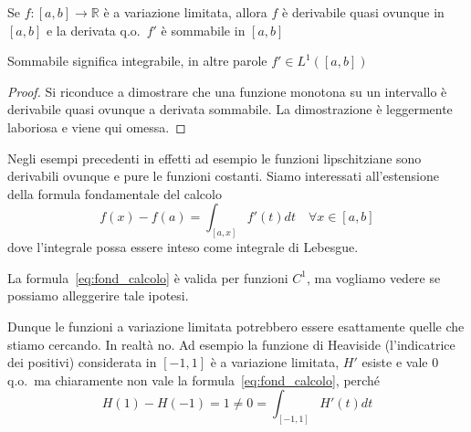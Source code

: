 \begin{theorem}\label{thm:lebesgue_derivata}
    Se \(f: [a,b] \to \mathbb{R}\) è a variazione limitata, allora \(f\) è
    derivabile quasi ovunque in \([a,b]\) e la derivata q.o.~\(f'\) è sommabile
    in \([a,b]\) 
\end{theorem}
\begin{remark}
    Sommabile significa integrabile, in altre parole \(f' \in L^{1}{([a,b])}\) 
\end{remark}
\begin{proof}
    Si riconduce a dimostrare che una funzione monotona su un intervallo è
    derivabile quasi ovunque a derivata sommabile. La dimostrazione è
    leggermente laboriosa e viene qui omessa. 
\end{proof}
Negli esempi precedenti in effetti ad esempio le funzioni lipschitziane sono
derivabili ovunque e pure le funzioni costanti.
Siamo interessati all'estensione della formula fondamentale del calcolo
\begin{equation}\label{eq:fond_calcolo}
    f{(x)} - f{(a)} = \int_{[a,x]} f'{(t)} dt \quad \forall x \in [a,b]
\end{equation}
dove l'integrale possa essere inteso come integrale di Lebesgue.
\begin{note}
    La formula~\eqref{eq:fond_calcolo} è valida per funzioni \(C^{1}\),
    ma vogliamo vedere se possiamo alleggerire tale ipotesi.
\end{note}
Dunque le funzioni a variazione limitata potrebbero essere esattamente quelle
che stiamo cercando. In realtà no. Ad esempio la funzione di Heaviside
(l'indicatrice dei positivi) considerata in \([-1, 1]\) è a variazione limitata,
\(H'\) esiste e vale 0 q.o.~ma chiaramente non vale la
formula~\eqref{eq:fond_calcolo}, perché 
\[
    H{(1)} - H{(-1)} = 1 \neq 0 = \int_{[-1, 1]} H'{(t)} dt 
\]

